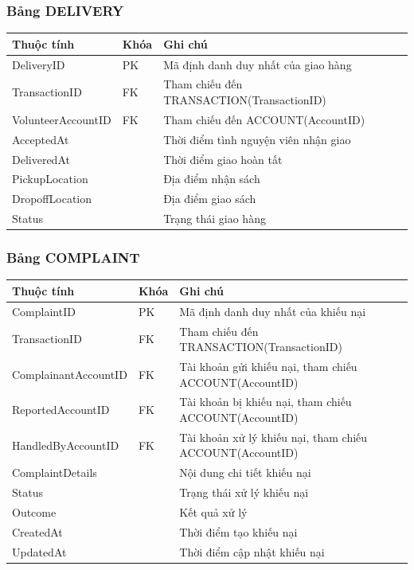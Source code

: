 \documentclass{article}
\begin{document}
\subsubsection*{Bảng DELIVERY}
{\small
\begin{longtable}{L{0.28\textwidth}L{0.12\textwidth}L{0.52\textwidth}}
\toprule
\textbf{Thuộc tính} & \textbf{Khóa} & \textbf{Ghi chú} \\
\midrule
DeliveryID & PK & Mã định danh duy nhất của giao hàng \\
TransactionID & FK & Tham chiếu đến TRANSACTION(TransactionID) \\
VolunteerAccountID & FK & Tham chiếu đến ACCOUNT(AccountID) \\
AcceptedAt & & Thời điểm tình nguyện viên nhận giao \\
DeliveredAt & & Thời điểm giao hoàn tất \\
PickupLocation & & Địa điểm nhận sách \\
DropoffLocation & & Địa điểm giao sách \\
Status & & Trạng thái giao hàng \\
\bottomrule
\end{longtable}
}

\subsubsection*{Bảng COMPLAINT}
{\small
\begin{longtable}{L{0.28\textwidth}L{0.12\textwidth}L{0.52\textwidth}}
\toprule
\textbf{Thuộc tính} & \textbf{Khóa} & \textbf{Ghi chú} \\
\midrule
ComplaintID & PK & Mã định danh duy nhất của khiếu nại \\
TransactionID & FK & Tham chiếu đến TRANSACTION(TransactionID) \\
ComplainantAccountID & FK & Tài khoản gửi khiếu nại, tham chiếu ACCOUNT(AccountID) \\
ReportedAccountID & FK & Tài khoản bị khiếu nại, tham chiếu ACCOUNT(AccountID) \\
HandledByAccountID & FK & Tài khoản xử lý khiếu nại, tham chiếu ACCOUNT(AccountID) \\
ComplaintDetails & & Nội dung chi tiết khiếu nại \\
Status & & Trạng thái xử lý khiếu nại \\
Outcome & & Kết quả xử lý \\
CreatedAt & & Thời điểm tạo khiếu nại \\
UpdatedAt & & Thời điểm cập nhật khiếu nại \\
\bottomrule
\end{longtable}
}
\end{document}
